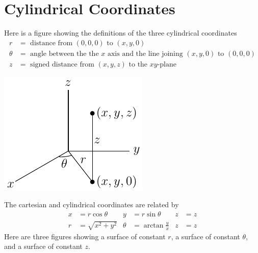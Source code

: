 \section{Cylindrical Coordinates}\label{ap:cylCoord}

Here is a figure showing the definitions of the 
three cylindrical coordinates 
\begin{align*}
r&=\text{ distance from }(0,0,0)\text{ to }(x,y,0)\\
\theta&=\text{ angle between the the $x$ axis and the line joining $(x,y,0)$ to $(0,0,0)$}\\
z&=\text{ signed distance from }(x,y,z)
\text{ to the $xy$-plane}
\end{align*}
\begin{efig}
\begin{center}
    \includegraphics{cyl1.pdf}
\end{center}
\end{efig}
The cartesian and cylindrical coordinates
are related by
\begin{align*}
x&=r\cos\theta &
y&=r\sin\theta &
z&=z \\
    r&=\sqrt{x^2+y^2} &
    \theta&=\arctan\frac{y}{x} &
    z&=z
\end{align*}
Here are three figures showing a surface of constant $r$,
a surface of constant $\theta$, and a surface of constant $z$.
